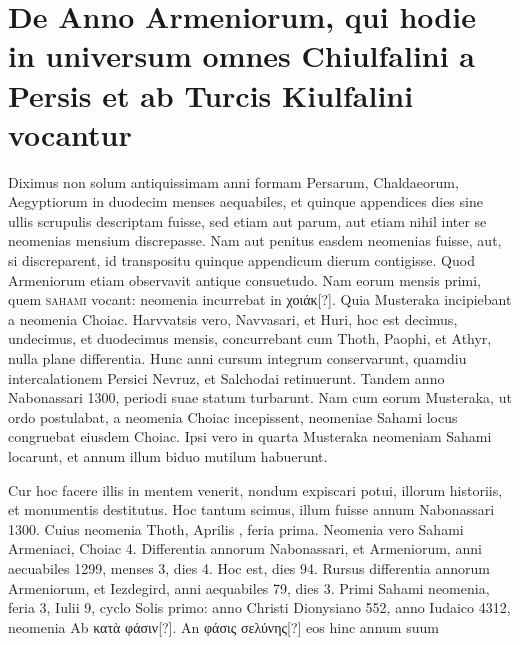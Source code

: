 \section[De Anno Armeniorum]{De Anno Armeniorum, qui hodie in universum omnes Chiulfalini a Persis et ab Turcis Kiulfalini vocantur}
%
Diximus non solum antiquissimam anni formam Persarum,
Chaldaeorum, Aegyptiorum in duodecim menses aequabiles,
et quinque appendices dies sine ullis scrupulis descriptam fuisse,
sed etiam aut parum, aut etiam nihil inter se neomenias mensium
discrepasse.
Nam aut penitus easdem neomenias fuisse, aut, si discreparent,
id transpositu quinque appendicum dierum contigisse.
Quod Armeniorum etiam observavit antique consuetudo.
Nam
eorum mensis primi, quem \textsc{sahami} vocant: neomenia incurrebat
in  \textgreek{χοιάκ}[?].
Quia Musteraka incipiebant a neomenia Choiac.
Harvvatsis vero, Navvasari, et Huri, hoc est decimus, undecimus,
et duodecimus mensis, concurrebant cum Thoth, Paophi, et Athyr,
nulla plane differentia.
Hunc anni cursum integrum conservarunt,
quamdiu intercalationem Persici Nevruz, et Salchodai retinuerunt.
Tandem anno Nabonassari 1300, periodi suae statum
turbarunt.
%
Nam cum eorum Musteraka, ut ordo postulabat, a neomenia
Choiac incepissent, neomeniae Sahami locus congruebat 
eiusdem Choiac.
Ipsi vero in quarta Musteraka neomeniam Sahami
locarunt, et annum illum biduo mutilum habuerunt.
%
\begin{table}[tbp] %
  
\end{table}
%
Cur hoc facere
illis in mentem venerit, nondum expiscari potui, illorum historiis,
et monumentis destitutus.
Hoc tantum scimus, illum fuisse annum
Nabonassari 1300.
Cuius neomenia Thoth, Aprilis , feria
prima.
Neomenia vero Sahami Armeniaci, Choiac 4.
Differentia annorum
Nabonassari, et Armeniorum, anni aecuabiles 1299, menses 3,
dies 4. %
Hoc est, dies 94.
Rursus differentia annorum Armeniorum, et
Iezdegird, anni aequabiles 79, dies 3.
Primi Sahami neomenia, feria 3,
Iulii 9, cyclo Solis primo: anno Christi Dionysiano 552, anno Iudaico
4312, neomenia Ab \textgreek{κατὰ φάσιν}[?].
An \textgreek{φάσις σελύνης}[?] eos hinc annum suum
